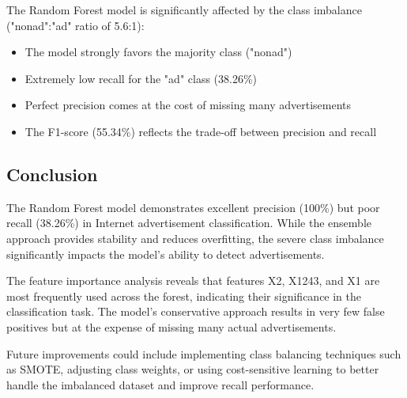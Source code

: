 The Random Forest model is significantly affected by the class imbalance ("nonad":"ad" ratio of 5.6:1):

\begin{itemize}
    \item The model strongly favors the majority class ("nonad")
    \item Extremely low recall for the "ad" class (38.26\%)
    \item Perfect precision comes at the cost of missing many advertisements
    \item The F1-score (55.34\%) reflects the trade-off between precision and recall
\end{itemize}

\subsection{Conclusion}

The Random Forest model demonstrates excellent precision (100\%) but poor recall (38.26\%) in Internet advertisement classification. While the ensemble approach provides stability and reduces overfitting, the severe class imbalance significantly impacts the model's ability to detect advertisements.

The feature importance analysis reveals that features X2, X1243, and X1 are most frequently used across the forest, indicating their significance in the classification task. The model's conservative approach results in very few false positives but at the expense of missing many actual advertisements.

Future improvements could include implementing class balancing techniques such as SMOTE, adjusting class weights, or using cost-sensitive learning to better handle the imbalanced dataset and improve recall performance.